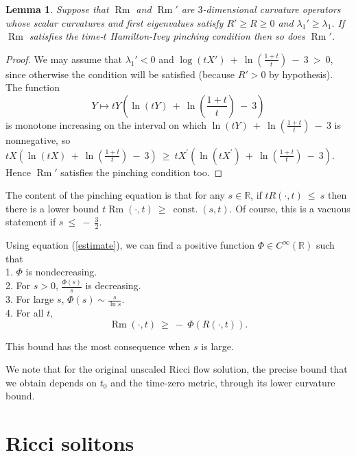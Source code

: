 \documentclass[12pt]{amsart}
\newcommand{\const}{\operatorname{const.}}
\newcommand{\R}{{\mathbb R}}
\newcommand{\Rm}{\operatorname{Rm}}
\newcommand{\la}{\lambda}
\numberwithin{equation}{section}
\theoremstyle{plain}
\newtheorem{lemma}[equation]{Lemma}
\theoremstyle{definition}
\theoremstyle{remark}
\begin{document}
\begin{lemma}
\label{lempinchingmonotonic}
Suppose that $\Rm$ and $\Rm'$  
are $3$-dimensional  curvature operators whose scalar curvatures
and first eigenvalues satisfy
$R'\geq R\geq 0$ and $\la_1'\geq \la_1$.
If $\Rm$ satisfies the time-$t$ Hamilton-Ivey pinching condition then so does 
$\Rm'$.
\end{lemma}
\begin{proof}
We may assume that  $\la_1'<0$ and 
$\log (tX') \: + \: \ln \left( \frac{1+t}{t} \right) \: - \: 3 \: > \: 0$,
since otherwise the condition will be satisfied
(because $R'>0$ by hypothesis).  The function 
\begin{equation}
Y\mapsto tY \left( \ln(t Y) \: + \: \ln \left( \frac{1+t}{t} \right) \: - \: 3 \right)
\end{equation}
is monotone increasing on the interval on which  
$\ln(t Y) \: + \: \ln \left( \frac{1+t}{t} \right) \: - \: 3$
is nonnegative, so 
$tX \left( \ln(t X) \: + \: \ln \left( \frac{1+t}{t} \right) \: - \: 3 \right)
\: \ge \:
tX^\prime \left( \ln(t X^\prime) \: + \: \ln \left( \frac{1+t}{t} \right) \: - \: 3 \right)$.
Hence $\Rm'$ satisfies the pinching condition too.
\end{proof}


The content of the pinching equation is that for any $s \in \R$,
if $t R(\cdot, t) \: \le \:
s$ then there is a lower bound $t \Rm (\cdot, t) \: \ge \: \const
(s, t)$. Of course, this is a vacuous statement
if $s \: \le \: - \: \frac{3}{2}$.

Using equation (\ref{estimate}), we can find a positive
function $\Phi \in C^\infty(\R)$ such that \\
1. $\Phi$ is nondecreasing. \\
2. For $s > 0$, $\frac{\Phi(s)}{s}$ is decreasing. \\
3. For large $s$,
$\Phi(s) \sim \frac{s}{\ln s}$. \\
4. For all $t$,
\begin{equation} \label{phi}
\Rm(\cdot, t) \: \ge \: - \: \Phi(R(\cdot, t)).
\end{equation}

This bound has the most consequence when $s$ is large.

We note that for the original unscaled Ricci flow
solution, the precise
bound that we obtain 
depends on $t_0$ and
the time-zero metric, through its lower curvature bound.

\section{Ricci solitons} \label{Riccisolitons}
\end{document}
